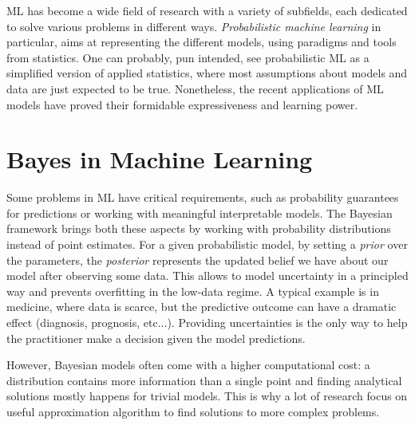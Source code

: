 

\ifpdf
    \graphicspath{{chapters/1_introduction/figures/}}
\else
    \graphicspath{{1_introduction/figures/EPS/}{1_introduction/figures/}}
\fi


\ac{ML} has become a wide field of research with a variety of subfields, each dedicated to solve various problems in different ways.
\textit{Probabilistic machine learning} in particular, aims at representing the different models, using paradigms and tools from statistics.
One can probably, pun intended, see probabilistic \ac{ML} as a simplified version of applied statistics, where most assumptions about models and data are just expected to be true. 
Nonetheless, the recent applications of \ac{ML} models have proved their formidable expressiveness and learning power.
 
\section{Bayes in Machine Learning}

Some problems in \ac{ML} have critical requirements, such as probability guarantees for predictions or working with meaningful interpretable models.
The Bayesian framework brings both these aspects by working with probability distributions instead of point estimates.
For a given probabilistic model, by setting a \textit{prior} over the parameters, the \textit{posterior} represents the updated belief we have about our model after observing some data.
This allows to model uncertainty in a principled way and prevents overfitting in the low-data regime.
A typical example is in medicine, where data is scarce, but the predictive outcome can have a dramatic effect (diagnosis, prognosis, etc...).
Providing uncertainties is the only way to help the practitioner make a decision given the model predictions.

However, Bayesian models often come with a higher computational cost: a distribution contains more information than a single point and finding analytical solutions mostly happens for trivial models.
This is why a lot of research focus on useful approximation algorithm to find solutions to more complex problems.

